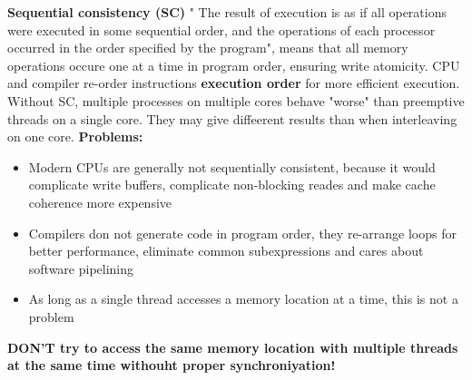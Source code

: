 \documentclass[11pt,a4paper]{article}
\begin{document}
	\textbf{Sequential consistency (SC)} " The result of execution is as if all operations were executed in some sequential order, and the operations of each processor occurred in the order specified by the program", means that all memory operations occure one at a time in program order, ensuring write atomicity. \newline
	CPU and compiler re-order instructions \textbf{execution order} for more efficient execution. Without SC, multiple processes on multiple cores behave "worse" than preemptive threads on a single core. They may give diffeerent results than when interleaving on one core. \newline
	\textbf{Problems:}
	\begin{itemize}
		\item Modern CPUs are generally not sequentially consistent, because it would complicate write buffers, complicate non-blocking reades and make cache coherence more expensive
		\item Compilers don not generate code in program order, they re-arrange loops for better performance, eliminate common subexpressions and cares about software pipelining
		\item As long as a single thread accesses a memory location at a time, this is not a problem
	\end{itemize}
	\textbf{DON'T try to access the same memory location with multiple threads at the same time withouht proper synchroniyation!} \newline
	
\end{document}
